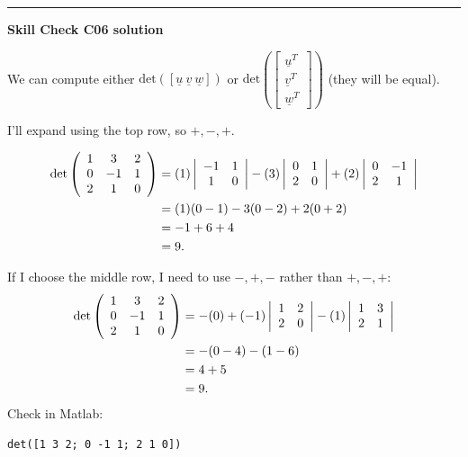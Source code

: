 \documentclass[12pt,letterpaper,noanswers]{exam}
\newcommand{\mb}[1]{\underline{#1}}
\begin{document}
\vspace{0.2cm}

\hrule
\vspace{0.2cm}

\noindent\textbf{Skill Check C06 solution}
\begin{questions}
\item We can compute either $\text{det}\left([\mb{u}\ \mb{v}\ \mb{w} ]\right)$ or $\text{det}\left(\left[\begin{array}{c}\mb{u}^T \\ \mb{v}^T \\ \mb{w}^T \end{array}\right]\right)$ (they will be equal).


I'll expand using the top row, so $+,-,+$.

\begin{align*}
    \text{det}\left(\begin{array}{c c c}1 & 3 & 2 \\ 0 & -1 & 1 \\ 2 & 1 & 0 \end{array}\right) &= (1) \left\vert \begin{array}{c c} -1 & 1 \\ 1 & 0\end{array}\right\vert- (3) \left\vert \begin{array}{c c} 0 & 1 \\ 2 & 0\end{array} \right\vert + (2) \left\vert \begin{array}{c c}0 & -1 \\ 2 & 1\end{array} \right\vert \\
    &= (1)(0-1) -3(0-2) +2(0+2) \\
    &= -1 +6 + 4\\
    &= 9.
\end{align*}

If I choose the middle row, I need to use $-,+,-$ rather than $+,-,+$:
\begin{align*}
\text{det}\left(\begin{array}{c c c}1 & 3 & 2 \\ 0 & -1 & 1 \\ 2 & 1 & 0 \end{array}\right) &= -(0) + (-1) \left\vert \begin{array}{c c} 1 & 2 \\ 2 & 0\end{array} \right\vert - (1) \left\vert \begin{array}{c c}1 & 3 \\ 2 & 1\end{array} \right\vert \\
    &=  -(0-4) -(1-6) \\
    &= 4 +5\\
    &= 9.
\end{align*}
Check in Matlab:
\begin{lstlisting}
det([1 3 2; 0 -1 1; 2 1 0])
\end{lstlisting}
\end{questions}
\end{document}
